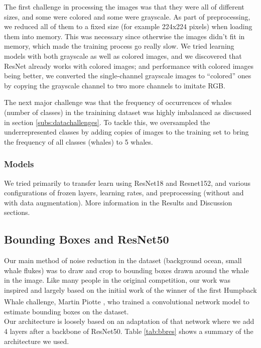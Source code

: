 The first challenge in processing the images was that they were all of different sizes, and some were colored and some were grayscale. As part of preprocessing, we reduced all of them to a fixed size (for example 224x224 pixels) when loading them into memory. This was necessary since otherwise the images didn't fit in memory, which made the training process go really slow. We tried learning models with both grayscale as well as colored images, and we discovered that ResNet already works with colored images; and performance with colored images being better, we converted the single-channel grayscale images to ``colored'' ones by copying the grayscale channel to two more channels to imitate RGB.

The next major challenge was that the frequency of occurrences of whales (number of classes) in the trainining dataset was highly imbalanced as discussed in section \ref{subs:datachallenges}. To tackle this, we oversampled the underrepresented classes by adding copies of images to the training set to bring the frequency of all classes (whales) to 5 whales.

\subsubsection{Models}

We tried primarily to transfer learn using ResNet18 and Resnet152, and various configurations of frozen layers, learning rates, and preprocessing (without and with data augmentation). More information in the Results and Discussion sections.

\subsection{Bounding Boxes and ResNet50}

Our main method of noise reduction in the dataset (background ocean, small whale flukes) was to draw and crop to bounding boxes drawn around the whale in the image. Like many people in the original competition, our work was inspired and largely based on the initial work of the winner of the first Humpback Whale challenge, Martin Piotte \textsuperscript{\cite{martin}}, who trained a convolutional network model to estimate bounding boxes on the dataset.\\

Our architecture is loosely based on an adaptation of that network where we add 4 layers after a backbone of ResNet50. Table \ref{tab:bbres} shows a summary of the architecture we used. 


